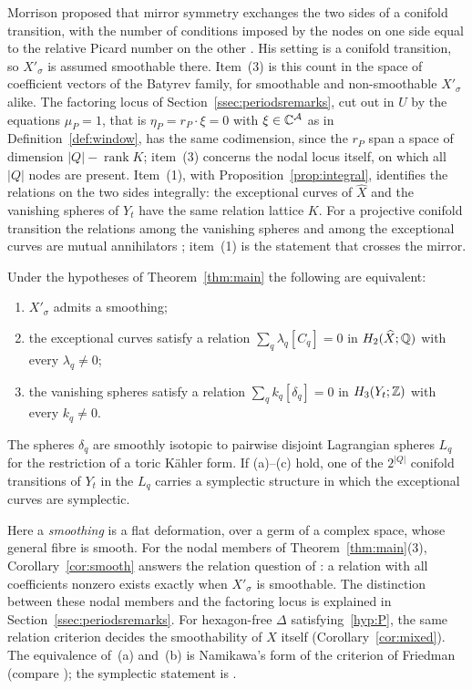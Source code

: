 Morrison proposed that mirror symmetry exchanges the two sides of a conifold transition, with the number of conditions
imposed by the nodes on one side equal to the relative Picard number on the other \cite[\S3.1]{Mor99}. His setting
is a conifold transition, so $X'_\sigma$ is assumed smoothable there. Item~(3) is this count in the space of
coefficient vectors of the Batyrev family, for smoothable and non-smoothable $X'_\sigma$ alike. The factoring locus
of Section~\ref{ssec:periodsremarks}, cut out in $U$ by the equations $\mu_P=1$, that is $\eta_P=r_P\cdot\xi=0$ with
$\xi\in\mathbb C^{\mathcal A}$ as in Definition~\ref{def:window}, has the same codimension, since the $r_P$ span a space of
dimension $|Q|-\operatorname{rank}K$; item~(3) concerns the nodal locus itself, on which
all $|Q|$ nodes are present. Item~(1), with Proposition~\ref{prop:integral}, identifies the relations on the two sides
integrally: the exceptional curves of $\widehat X$ and the vanishing spheres of $Y_t$ have the same relation lattice $K$. For a projective conifold transition
the relations among the vanishing spheres and among the exceptional curves are mutual annihilators
\cite[Thm.~1.14]{LLW18}; item~(1) is the statement that crosses the mirror.

\begin{maincor}\label{cor:smooth}
Under the hypotheses of Theorem~\ref{thm:main} the following are equivalent:
\begin{enumerate}
\item[(a)] $X'_\sigma$ admits a smoothing;
\item[(b)] the exceptional curves satisfy a relation $\sum_q\lambda_q[C_q]=0$ in $H_2(\widehat X;\mathbb Q)$ with every
$\lambda_q\neq0$;
\item[(c)] the vanishing spheres satisfy a relation $\sum_qk_q[\delta_q]=0$ in $H_3(Y_t;\mathbb Z)$ with every $k_q\neq0$.
\end{enumerate}
The spheres $\delta_q$ are smoothly isotopic to pairwise disjoint Lagrangian spheres $L_q$ for the restriction of a
toric K\"ahler form. If (a)--(c) hold, one of the $2^{|Q|}$ conifold transitions of $Y_t$ in the $L_q$ carries a
symplectic structure in which the exceptional curves are symplectic.
\end{maincor}

Here a \emph{smoothing} is a flat deformation, over a germ of a complex space, whose general fibre is smooth.
For the nodal members of Theorem~\ref{thm:main}(3), Corollary~\ref{cor:smooth} answers the relation question of
\cite[\S3]{BK10}: a relation with all coefficients nonzero exists exactly when $X'_\sigma$ is smoothable.
The distinction between these nodal members and the factoring locus is explained in
Section~\ref{ssec:periodsremarks}. For hexagon-free
$\Delta$ satisfying~\ref{hyp:P}, the same relation criterion decides the smoothability of $X$ itself (Corollary~\ref{cor:mixed}). The equivalence of~(a)
and~(b) is Namikawa's form \cite[Thm.~2.5]{Nam02} of the criterion of Friedman \cite[Rem.~(4.5), Cor.~(4.7)]{Friedman}
(compare \cite[Thms.~1.2 and~1.3]{RT09}); the symplectic statement is \cite[Thm.~2.9]{STY}.

